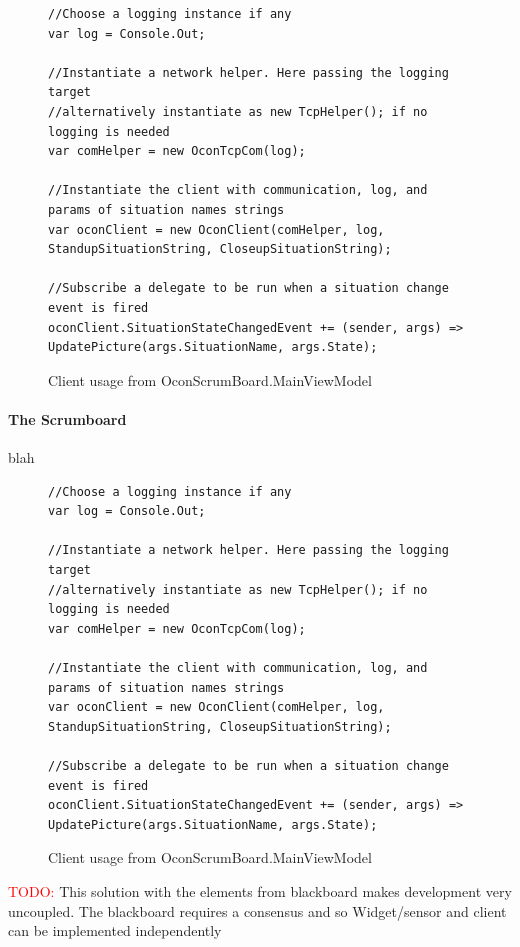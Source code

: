 \documentclass[]{report}
\newcommand\todo[1]{\textcolor{red}{TODO: }#1\PackageWarning{TODO:}{TODO tag!!}}
\begin{document}
\begin{figure}[H]
\begin{lstlisting}
//Choose a logging instance if any
var log = Console.Out;

//Instantiate a network helper. Here passing the logging target
//alternatively instantiate as new TcpHelper(); if no logging is needed
var comHelper = new OconTcpCom(log);

//Instantiate the client with communication, log, and params of situation names strings
var oconClient = new OconClient(comHelper, log, StandupSituationString, CloseupSituationString);

//Subscribe a delegate to be run when a situation change event is fired
oconClient.SituationStateChangedEvent += (sender, args) => UpdatePicture(args.SituationName, args.State);
\end{lstlisting}
\caption{Client usage from OconScrumBoard.MainViewModel}
\label{code:OconCentral}
\end{figure}

\paragraph{The Scrumboard} blah \\

\begin{figure}[H]
\begin{lstlisting}
//Choose a logging instance if any
var log = Console.Out;

//Instantiate a network helper. Here passing the logging target
//alternatively instantiate as new TcpHelper(); if no logging is needed
var comHelper = new OconTcpCom(log);

//Instantiate the client with communication, log, and params of situation names strings
var oconClient = new OconClient(comHelper, log, StandupSituationString, CloseupSituationString);

//Subscribe a delegate to be run when a situation change event is fired
oconClient.SituationStateChangedEvent += (sender, args) => UpdatePicture(args.SituationName, args.State);
\end{lstlisting}
\caption{Client usage from OconScrumBoard.MainViewModel}
\label{code:OconClient}
\end{figure}


\todo{This solution with the elements from blackboard makes development very uncoupled. The blackboard requires a consensus and so Widget/sensor and client can be implemented independently}
\end{document}
